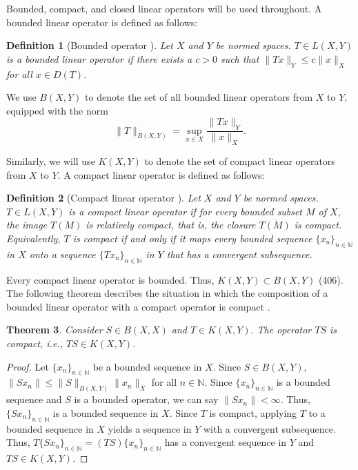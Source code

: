 \documentclass[12pt,a4paper]{article}
\theoremstyle{boldthm}
\newtheorem{theorem}{Theorem}[section]
\theoremstyle{bolddefn}
\newtheorem{definition}[theorem]{Definition}
\begin{document}
Bounded, compact, and closed linear operators will be used throughout. A bounded linear operator is defined as follows:
\begin{definition}[{Bounded operator \cite[2.7-1]{krey}}] 
    Let $X$ and $Y$ be normed spaces. $T \in L(X, Y)$ is a bounded linear operator if there exists a $c>0$ such that $\|Tx\|_Y \le c \|x\|_X$ for all $x \in D(T).$ 
\end{definition}
We use $B(X,Y)$ to denote the set of all bounded linear operators from $X$ to $Y,$ equipped with the norm 
\begin{equation}
    \|T\|_{B(X, Y)} = \sup_{x \in X} \frac{\| Tx \|_Y}{\|x\|_X}.
\end{equation}

Similarly, we will use $K(X, Y)$ to denote the set of compact linear operators from $X$ to $Y.$ A compact linear operator is defined as follows:

\begin{definition}[{Compact linear operator \cite[8.1-1]{krey}}] 
Let $X$ and $Y$ be normed spaces. $T \in L(X, Y)$ is a compact linear operator if for every bounded subset $M$ of $X,$ the image $T(M)$ is relatively compact, that is, the closure $\overline{T(M)}$ is compact. Equivalently, $T$ is compact if and only if it maps every bounded sequence $\{x_n\}_{n \in \mathbb{N}}$ in $X$ onto a sequence  $\{Tx_n\}_{n \in \mathbb{N}}$ in $Y$ that has a convergent subsequence.
\end{definition}
Every compact linear operator is bounded. Thus, $K(X, Y) \subset B(X, Y)$ (406). The following theorem describes the situation in which the composition of a bounded linear operator with a compact operator is compact \cite{umberto}.

\begin{theorem}
   Consider $S \in B(X, X)$ and $T \in K(X, Y).$ The operator $TS$ is compact, i.e., $TS \in K(X, Y).$  
\end{theorem}

\begin{proof}
    Let $\{x_n\}_{n \in \mathbb{N}}$ be a bounded sequence in $X.$ Since $S \in B(X, Y),$ $\| S x_n \| \le \| S \|_{B(X, Y)} \| x_n \|_{X}$ for all $n \in \mathbb{N}.$ Since $\{x_n\}_{n \in \mathbb{N}}$ is a bounded sequence and $S$ is a bounded operator, we can say  $\|S x_n \| < \infty.$ Thus, $\{S x_n\}_{n \in \mathbb{N}}$ is a bounded sequence in $X.$  Since $T$ is compact, applying $T$ to a bounded sequence in $X$ yields a sequence in $Y$ with a convergent subsequence. Thus, $T\{S x_n\}_{n \in \mathbb{N}} = (TS)\{ x_n\}_{n \in \mathbb{N}}$ has a convergent sequence in $Y$ and $TS \in K(X, Y).$
\end{proof}
\end{document}
